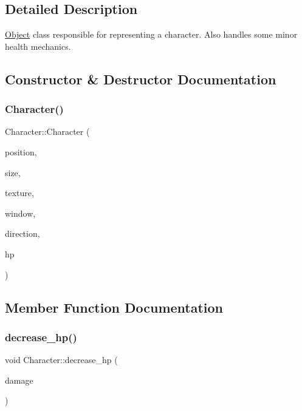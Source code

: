\subsection{Detailed Description}
\hyperlink{classObject}{Object} class responsible for representing a character. Also handles some minor health mechanics. 

\subsection{Constructor \& Destructor Documentation}
\mbox{\label{classCharacter_a756e9c6ac793958b9028808abdbee2bd}} 
\subsubsection{\texorpdfstring{Character()}{Character()}}
{\footnotesize\ttfamily Character\+::\+Character (\begin{DoxyParamCaption}\item[{std\+::shared\+\_\+ptr$<$ sf\+::\+Vector2f $>$}]{position,  }\item[{std\+::shared\+\_\+ptr$<$ sf\+::\+Vector2f $>$}]{size,  }\item[{std\+::shared\+\_\+ptr$<$ sf\+::\+Texture $>$}]{texture,  }\item[{sf\+::\+Render\+Window $\ast$}]{window,  }\item[{std\+::string}]{direction,  }\item[{int}]{hp }\end{DoxyParamCaption})}



\subsection{Member Function Documentation}
\mbox{\label{classCharacter_aeda14114ec98feafd872b9b9b8e0644c}} 
\subsubsection{\texorpdfstring{decrease\+\_\+hp()}{decrease\_hp()}}
{\footnotesize\ttfamily void Character\+::decrease\+\_\+hp (\begin{DoxyParamCaption}\item[{int}]{damage }\end{DoxyParamCaption})}

